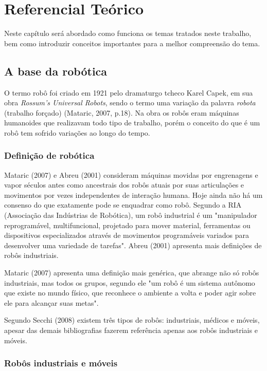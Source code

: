 \chapter[Referencial Teórico]{Referencial Teórico}

Neste capítulo será abordado como funciona os temas tratados neste trabalho, bem como introduzir conceitos importantes para a melhor compreensão do tema.

\section{A base da robótica}

O termo robô foi criado em 1921 pelo dramaturgo tcheco Karel Capek, em sua obra \textit{Rossum’s Universal Robots}, sendo o  termo uma variação da palavra \textit{robota} (trabalho forçado) (Mataric, 2007, p.18). Na obra os robôs eram máquinas humanoides que realizavam todo tipo de trabalho, porém o conceito do que é um robô tem sofrido variações ao longo do tempo. 

\subsection{Definição de robótica}

Mataric (2007) e Abreu (2001) consideram máquinas movidas por engrenagens e vapor séculos antes como ancestrais dos robôs atuais por suas articulações e movimentos por vezes independentes de interação humana. Hoje ainda não há um consenso do que exatamente pode se enquadrar como robô. Segundo a RIA (Associação das Indústrias de Robótica), um robô industrial é um "manipulador reprogramável, multifuncional, projetado para mover material, ferramentas ou dispositivos especializados através de movimentos programáveis variados para desenvolver uma variedade de tarefas". Abreu (2001) apresenta mais definições de robôs industriais. 

Mataric (2007) apresenta uma definição mais genérica, que abrange não só robôs industriais, mas todos os grupos, segundo ele "um robô é um sistema autônomo que existe no mundo físico, que reconhece o ambiente a volta e poder agir sobre ele para alcançar suas metas".

Segundo Secchi (2008) existem três tipos de robôs: industriais, médicos e móveis, apesar das demais bibliografias fazerem referência apenas aos robôs industriais e móveis.

\subsection{Robôs industriais e móveis}

